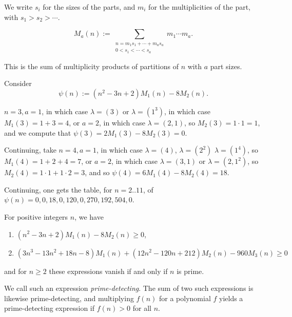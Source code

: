 \documentclass[reqno]{amsart} 
\begin{document}
We write $s_i$ for the sizes of the parts, and $m_i$ for the multiplicities of the part, with $s_1 > s_2 > \dotsb$.
\begin{definition}[MacMahon 1920]
  \begin{equation*}
    M_a(n) := \sum_{
      \substack{
        n = m_1 s_1 + \dotsb + m_a s_a  \\
        0 < s_1 < \dotsb < s_a        
      }
    } m_1 \dotsb m_a.
  \end{equation*}
\end{definition}
\begin{remark}
  This is the sum of multiplicity products of partitions of $n$ with $a$ part sizes.
\end{remark}
Consider
\begin{equation*}
  \psi(n) :=(n^2 - 3 n + 2) M_1(n) - 8 M_2(n).
\end{equation*}
\begin{example}
  $n = 3, a = 1$, in which case $\lambda =(3)$ or $\lambda =(1^3)$, in which case $M_1(3) = 1 + 3 = 4$,
  or $a = 2$, in which case $\lambda =(2, 1)$, so $M_2(3) = 1 \cdot 1 = 1$, and we compute that $\psi(3) = 2 M_1(3) - 8 M_2(3) = 0$.

  Continuing, take $n = 4, a = 1$, in which case $\lambda = (4)$, $\lambda = (2^2)$ $\lambda =(1^4)$, so $M_1(4) = 1 + 2 + 4 = 7$,
  or $a = 2$, in which case $\lambda =(3, 1)$ or $\lambda =(2, 1^2)$, so $M_2(4) = 1 \cdot 1 + 1 \cdot 2 = 3$, and so $\psi(4) = 6 M_1(4) - 8 M_2(4) = 18$.

  Continuing, one gets the table, for $n = 2..11$, of $\psi(n) = 0, 0, 18, 0, 120, 0, 270, 192, 504, 0$.
\end{example}

\begin{theorem} For positive integers $n$, we have
  \begin{enumerate}
  \item $(n^2 - 3 n + 2) M_1(n) - 8 M_2(n) \geq 0$,
  \item $(3 n^3 - 13 n^2 + 18 n - 8) M_1(n) +(12 n^2 - 120 n + 212) M_2(n) - 960 M_3(n) \geq 0$
  \end{enumerate}
  and for $n \geq 2$ these expressions vanish if and only if $n$ is prime.
\end{theorem}
\begin{remark}
  We call such an expression \emph{prime-detecting}.  The sum of two such expressions is likewise prime-detecting, and multiplying $f(n)$ for a polynomial $f$ yields a prime-detecting expression if $f(n) > 0$ for all $n$.
\end{remark}
\end{document}
